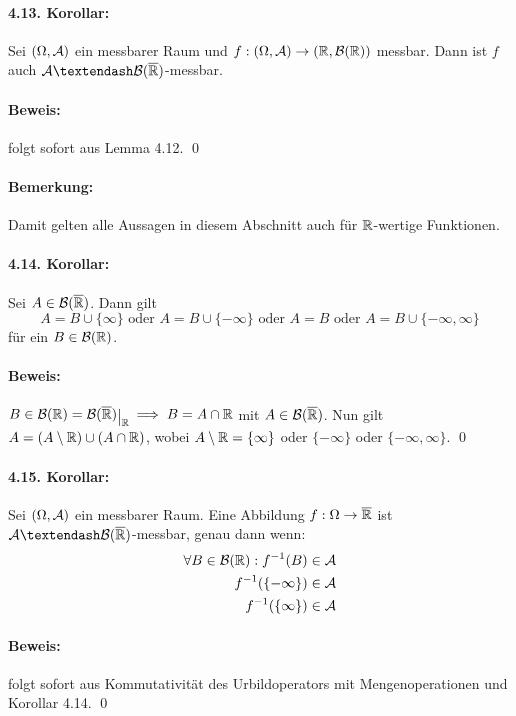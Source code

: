  \paragraph{4.13. Korollar:}Sei $(\Omega,\mathcal{A})$ ein messbarer Raum und $f:(\Omega,\mathcal{A})\to(\mathbb{R},\mathcal{B}(\mathbb{R}))$ messbar. Dann ist $f$ auch $\A\textendash\cB(\overline\R)$-messbar.
 
 \paragraph{Beweis:}folgt sofort aus Lemma 4.12. \qed
 
 \paragraph{Bemerkung:}Damit gelten alle Aussagen in diesem Abschnitt auch f\"ur $\mathbb{R}$-wertige Funktionen.
 
 \paragraph{4.14. Korollar:}Sei $A\in\mathcal{B}(\overline{\mathbb{R}})$. Dann gilt
 $$A=B\cup\{\infty\} \text{ oder } A=B\cup\{-\infty\} \text{ oder } A=B \text{ oder } A=B\cup\{-\infty,\infty\}$$
 f\"ur ein $B\in\mathcal{B}(\mathbb{R})$.
 
 \paragraph{Beweis:}$B\in\borel=\cB(\overline\R)\krestr{\R}\implies B=A\cap\R$ mit $A\in\mathcal{B}(\overline{\mathbb{R}})$. Nun gilt $A=(A\setminus\mathbb{R})\cup(A\cap\mathbb{R})$, wobei $A\setminus\mathbb{R}=\{\infty\}$ oder $\{-\infty\}$ oder $\{-\infty,\infty\}$. \qed
 
 \paragraph{4.15. Korollar:}Sei $(\Omega,\mathcal{A})$ ein messbarer Raum. Eine Abbildung $f:\Omega\to\overline{\mathbb{R}}$ ist $\A\textendash\cB(\overline\R)$-messbar, genau dann wenn:
 \begin{align*}
     \forall B\in\mathcal{B}(\mathbb{R}):f^{-1}(B)&\in\mathcal{A}\\
     f^{-1}(\{-\infty\})&\in\mathcal{A}\\
     f^{-1}(\{\infty\})&\in\mathcal{A}
 \end{align*}
 
 \paragraph{Beweis:}folgt sofort aus Kommutativit\"at des Urbildoperators mit Mengenoperationen und Korollar 4.14. \qed
 
